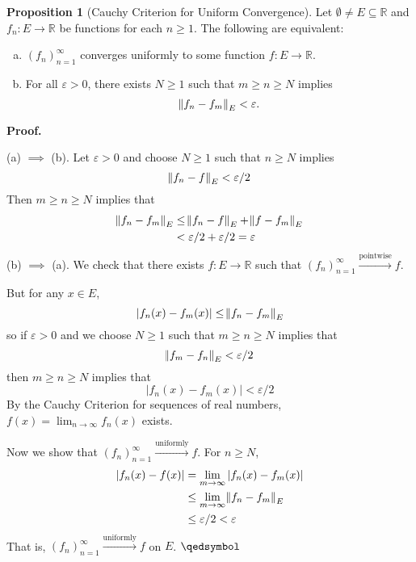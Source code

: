 \documentclass[11pt]{article}
\theoremstyle{definition}
\newtheorem{prop}[thm]{Proposition}
\newcommand{\mbR}{\ensuremath{\mathbb{R}}}
\newcommand{\ptwise}{\xrightarrow{\text{pointwise}}}
\newcommand{\unif}{\xrightarrow{\text{uniformly}}}
\begin{document}
\begin{prop}[Cauchy Criterion for Uniform Convergence]
Let $\emptyset \ne E \subseteq \mbR$ and $f_n : E \to \mbR$ be functions for each $n \geq 1$. The following are equivalent:
\begin{enumerate}[(a)] \vspace{-0.2cm}
\item $(f_n)_{n=1}^\infty$ converges uniformly to some function $f : E \to \mbR$.
\item For all $\varepsilon > 0$, there exists $N \geq 1$ such that $m \geq n \geq N$ implies
$$\norm{f_n - f_m}_E < \varepsilon.$$
\end{enumerate}
\end{prop}
\textbf{Proof.} 

(a) $\implies$ (b). Let $\varepsilon > 0$ and choose $N \geq 1$ such that $n \geq N$ implies
$$\norm{f_n - f}_E < \varepsilon / 2$$
Then $m \geq n \geq N$ implies that
\begin{align*}
\norm{f_n - f_m}_E & \leq \norm{f_n - f}_E + \norm{f - f_m}_E \\
& < \varepsilon / 2 + \varepsilon / 2 = \varepsilon
\end{align*}
(b) $\implies$ (a). We check that there exists $f : E \to \mbR$ such that $(f_n)_{n=1}^\infty \ptwise f$. 

But for any $x \in E$,
$$|f_n(x) - f_m(x)| \leq \norm{f_n - f_m}_E$$
so if $\varepsilon > 0$ and we choose $N \geq 1$ such that $m \geq n \geq N$ implies that
$$\norm{f_m - f_n}_E < \varepsilon / 2$$
then $m \geq n \geq N$ implies that
$$|f_n(x) - f_m(x)| < \varepsilon / 2$$
By the Cauchy Criterion for sequences of real numbers, $f(x) = \lim_{n\to\infty} f_n(x)$ exists.

Now we show that $(f_n)_{n=1}^\infty \unif f$. For $n \geq N$,
\begin{align*}
|f_n(x) - f(x)| & = \lim_{m\to\infty} |f_n(x) - f_m(x)| \\
& \leq \lim_{m\to\infty} \norm{f_n - f_m}_E \\
& \leq \varepsilon / 2 < \varepsilon
\end{align*}
That is, $(f_n)_{n=1}^\infty \unif f$ on $E$. $\qedsymbol$
\end{document}
